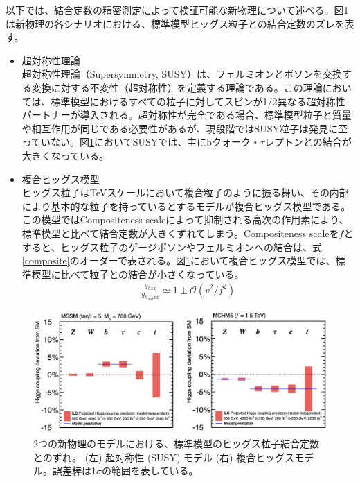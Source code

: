 以下では、結合定数の精密測定によって検証可能な新物理について述べる。図\ref{bsmdecay}は新物理の各シナリオにおける、標準模型ヒッグス粒子との結合定数のズレを表す。
\begin{itemize}
\item{超対称性理論}\\
超対称性理論（Supersymmetry, SUSY）は、フェルミオンとボソンを交換する変換に対する不変性（超対称性）を定義する理論である。この理論においては、標準模型におけるすべての粒子に対してスピンが1/2異なる超対称性パートナーが導入される。超対称性が完全である場合、標準模型粒子と質量や相互作用が同じである必要性があるが、現段階ではSUSY粒子は発見に至っていない。図\ref{bsmdecay}においてSUSYでは、主にbクォーク・$\tau$レプトンとの結合が大きくなっている。
\item{複合ヒッグス模型}\\
ヒッグス粒子はTeVスケールにおいて複合粒子のように振る舞い、その内部により基本的な粒子を持っているとするモデルが複合ヒッグス模型である。この模型ではCompositeness scaleによって抑制される高次の作用素により、標準模型と比べて結合定数が大きくずれてしまう。Compositeness scaleを$f$とすると、ヒッグス粒子のゲージボソンやフェルミオンへの結合は、式\ref{composite}のオーダーで表される。図\ref{bsmdecay}において複合ヒッグス模型では、標準模型に比べて粒子との結合が小さくなっている。
\begin{align}
\label{composite}
\frac{g_{hxx}}{g_{h_{SM}xx}} \simeq 1 \pm \mathcal{O}(v^2 / f^2)
\end{align}
\end{itemize}
\begin{figure}[H]
	\begin{center}
 \includegraphics[keepaspectratio, scale=0.25]
 	{Figure/Introduction/bsmdecay.png}
 		\caption{2つの新物理のモデルにおける、標準模型のヒッグス粒子結合定数とのずれ。 (左) 超対称性 (SUSY) モデル (右) 複合ヒッグスモデル。誤差棒は1$\sigma$の範囲を表している。}
 		\label{bsmdecay}
	\end{center}
\end{figure}
